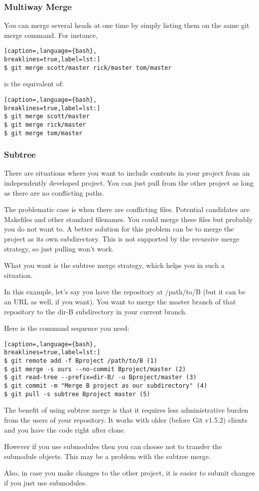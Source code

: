 \subsubsection{Multiway Merge}
You can merge several heads at one time by simply listing them on the same git
merge command. For instance,
\lstset{basicstyle=\scriptsize, numbers=none, captionpos=b, tabsize=4}
\begin{lstlisting}[caption=,language={bash},
breaklines=true,label=lst:]
$ git merge scott/master rick/master tom/master
\end{lstlisting}

is the equivalent of:
\lstset{basicstyle=\scriptsize, numbers=none, captionpos=b, tabsize=4}
\begin{lstlisting}[caption=,language={bash},
breaklines=true,label=lst:]
$ git merge scott/master
$ git merge rick/master
$ git merge tom/master
\end{lstlisting}

\subsubsection{Subtree}
There are situations where you want to include contents in your project from an
independently developed project. You can just pull from the other project as
long as there are no conflicting paths.

The problematic case is when there are conflicting files. Potential candidates
are Makefiles and other standard filenames. You could merge these files but
probably you do not want to. A better solution for this problem can be to merge
the project as its own subdirectory. This is not supported by the recursive
merge strategy, so just pulling won't work.

What you want is the subtree merge strategy, which helps you in such a
situation.

In this example, let's say you have the repository at /path/to/B (but it can be
an URL as well, if you want). You want to merge the master branch of that
repository to the dir-B subdirectory in your current branch.

Here is the command sequence you need:
\lstset{basicstyle=\scriptsize, numbers=none, captionpos=b, tabsize=4}
\begin{lstlisting}[caption=,language={bash},
breaklines=true,label=lst:]
$ git remote add -f Bproject /path/to/B (1)
$ git merge -s ours --no-commit Bproject/master (2)
$ git read-tree --prefix=dir-B/ -u Bproject/master (3)
$ git commit -m "Merge B project as our subdirectory" (4)
$ git pull -s subtree Bproject master (5)
\end{lstlisting}

The benefit of using subtree merge is that it requires less administrative
burden from the users of your repository. It works with older (before Git
v1.5.2) clients and you have the code right after clone.

However if you use submodules then you can choose not to transfer the submodule
objects. This may be a problem with the subtree merge.

Also, in case you make changes to the other project, it is easier to submit
changes if you just use submodules.
